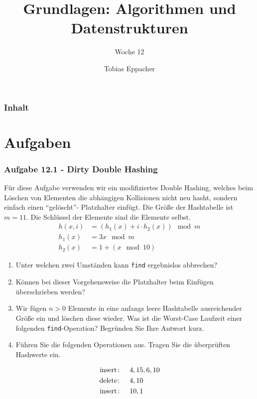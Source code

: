 \documentclass{beamer}
\title{Grundlagen: Algorithmen und Datenstrukturen}
\author{Tobias Eppacher}
\date{\presdatum}
\institute{School of Computation, Information and Technology}
\subtitle{Woche 12}
\begin{document}
\begin{frame}
	\titlepage
\end{frame}

\begin{frame}
	\frametitle{Inhalt}
	\tableofcontents[subsectionstyle=hide]
\end{frame}

\section{Aufgaben}

\begin{frame}
	\frametitle{Aufgabe 12.1 - Dirty Double Hashing}
	\scriptsize
	Für diese Aufgabe verwenden wir ein modifiziertes Double Hashing, welches beim Löschen
	von Elementen die abhängigen Kollisionen nicht neu hasht, sondern einfach einen “gelöscht”-
	Platzhalter einfügt.
	Die Größe der Hashtabelle ist $m = 11$. Die Schlüssel der Elemente sind die Elemente selbst.
	\begin{align*}
		h(x, i) & = (h_1(x) + i \cdot h_2(x)) \mod m \\
		h_1(x)  & = 3x \mod m                        \\
		h_2(x)  & = 1 + (x \mod 10)
	\end{align*}

	\begin{enumerate}[label=\textcolor{black}{\alph*)},align=left,leftmargin=*]
		\item Unter welchen zwei Umständen kann \lstinline{find} ergebnislos abbrechen?
		\item Können bei dieser Vorgehensweise die Platzhalter beim Einfügen überschrieben werden?
		\item Wir fügen $n > 0$ Elemente in eine anfangs leere Hashtabelle ausreichender Größe
		      ein und löschen diese wieder. Was ist die Worst-Case Laufzeit einer folgenden \lstinline{find}-Operation? Begründen Sie Ihre Antwort kurz.
		\item Führen Sie die folgenden Operationen aus. Tragen Sie die überprüften Hashwerte ein.
	\end{enumerate}
	\begin{align*}
		\text{\lstinline{insert}: } & \quad 4, 15, 6, 10 \\
		\text{\lstinline{delete}: } & \quad 4, 10        \\
		\text{\lstinline{insert}: } & \quad 10, 1
	\end{align*}

\end{frame}
\end{document}

